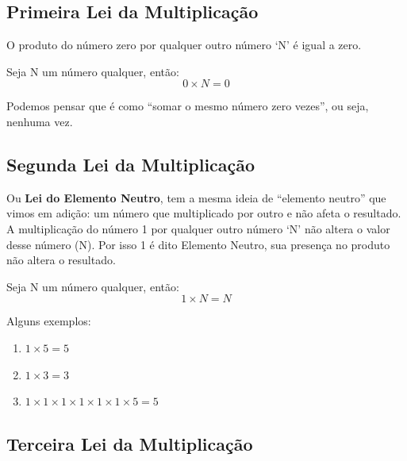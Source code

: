 \subsection{Primeira Lei da Multiplicação}

O produto do número zero por qualquer outro número ‘N’ é igual a zero.

\begin{tcolorbox}[title = Primeira Lei da Multiplicação]
    Seja N um número qualquer, então:
    \begin{equation}
        0 \times N = 0
    \end{equation}
\end{tcolorbox}


Podemos pensar que é como ``somar o mesmo número zero vezes'', ou seja, nenhuma vez.

\subsection{Segunda Lei da Multiplicação}

Ou \textbf{Lei do Elemento Neutro}, tem a mesma ideia de ``elemento neutro'' que vimos em adição: um número que multiplicado por outro e não afeta o resultado. A multiplicação do número 1 por qualquer outro número ‘N’ não altera o valor desse número (N). Por isso 1 é dito Elemento Neutro, sua presença no produto não altera o resultado.

\begin{tcolorbox}[title = Segunda Lei da Multiplicação]
    Seja N um número qualquer, então:
    \begin{equation}
        1 \times N = N
    \end{equation}
\end{tcolorbox}

\begin{exemplo}
    Alguns exemplos:

    \begin{enumerate}
        \item \(1 \times 5 = 5\)
        \item \(1 \times 3 = 3\)
        \item \(1 \times1 \times1 \times1 \times1 \times1 \times 5 = 5\)
    \end{enumerate}
\end{exemplo}

\subsection{Terceira Lei da Multiplicação}

